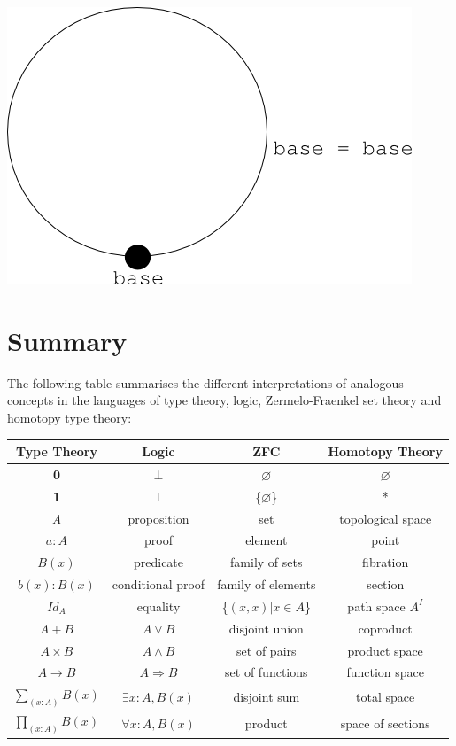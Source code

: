 \documentclass[12pt]{report}
\begin{document}
\begin{center}
\includegraphics[scale=0.57]{3.png}
\end{center}

\pagebreak
\section{Summary}

The following table summarises the different interpretations of analogous concepts in the languages of type theory, logic, Zermelo-Fraenkel set theory and homotopy type theory:

\begin{center}
\begin{tabular}{| c | c | c | c |}
\hline
\textbf{Type Theory} & \textbf{Logic} & \textbf{ZFC} & \textbf{Homotopy Theory}\\
\hline
\textbf{0} & $\bot$ & $\varnothing$ &$\varnothing$\\
\textbf{1} & $\top$ & \{$\varnothing$\} &*\\
\textit{A} & proposition & set & topological space\\
$a : A$ & proof & element & point\\
$B(x)$ & predicate & family of sets & fibration\\
$b(x) : B(x)$ & conditional proof & family of elements & section\\
$ Id_A $ & equality & \{$ (x,x) | x \in A $\} & path space $A^{\textit{I}}$\\
$A + B$ & $A \vee B$ & disjoint union & coproduct\\
$ A \times B$ & $A \wedge B$ & set of pairs & product space\\
$A \rightarrow B$ & $A \Rightarrow B$ & set of functions & function space\\
$ \sum_{(x:A)}^{} B(x) $ & $\exists x:A, B(x) $ & disjoint sum & total space\\
$ \prod_{(x:A)}^{} B(x) $ & $\forall x:A, B(x) $ & product & space of sections\\
\hline
\end{tabular}
\end{center}
\end{document}
